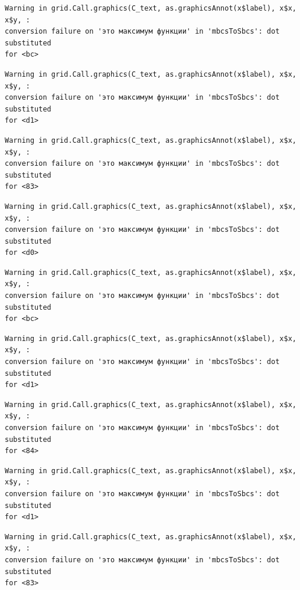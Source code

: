 \documentclass[
  letterpaper,
  DIV=11,
  numbers=noendperiod]{scrreprt}
\theoremstyle{definition}
\theoremstyle{remark}
\begin{document}
\begin{verbatim}
Warning in grid.Call.graphics(C_text, as.graphicsAnnot(x$label), x$x, x$y, :
conversion failure on 'это максимум функции' in 'mbcsToSbcs': dot substituted
for <bc>
\end{verbatim}

\begin{verbatim}
Warning in grid.Call.graphics(C_text, as.graphicsAnnot(x$label), x$x, x$y, :
conversion failure on 'это максимум функции' in 'mbcsToSbcs': dot substituted
for <d1>
\end{verbatim}

\begin{verbatim}
Warning in grid.Call.graphics(C_text, as.graphicsAnnot(x$label), x$x, x$y, :
conversion failure on 'это максимум функции' in 'mbcsToSbcs': dot substituted
for <83>
\end{verbatim}

\begin{verbatim}
Warning in grid.Call.graphics(C_text, as.graphicsAnnot(x$label), x$x, x$y, :
conversion failure on 'это максимум функции' in 'mbcsToSbcs': dot substituted
for <d0>
\end{verbatim}

\begin{verbatim}
Warning in grid.Call.graphics(C_text, as.graphicsAnnot(x$label), x$x, x$y, :
conversion failure on 'это максимум функции' in 'mbcsToSbcs': dot substituted
for <bc>
\end{verbatim}

\begin{verbatim}
Warning in grid.Call.graphics(C_text, as.graphicsAnnot(x$label), x$x, x$y, :
conversion failure on 'это максимум функции' in 'mbcsToSbcs': dot substituted
for <d1>
\end{verbatim}

\begin{verbatim}
Warning in grid.Call.graphics(C_text, as.graphicsAnnot(x$label), x$x, x$y, :
conversion failure on 'это максимум функции' in 'mbcsToSbcs': dot substituted
for <84>
\end{verbatim}

\begin{verbatim}
Warning in grid.Call.graphics(C_text, as.graphicsAnnot(x$label), x$x, x$y, :
conversion failure on 'это максимум функции' in 'mbcsToSbcs': dot substituted
for <d1>
\end{verbatim}

\begin{verbatim}
Warning in grid.Call.graphics(C_text, as.graphicsAnnot(x$label), x$x, x$y, :
conversion failure on 'это максимум функции' in 'mbcsToSbcs': dot substituted
for <83>
\end{verbatim}
\end{document}
